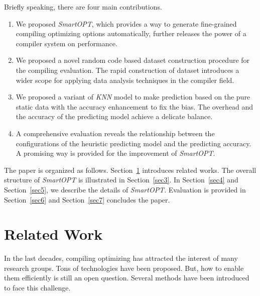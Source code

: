 \documentclass[bst/sn-mathphys]{sn-jnl}%
\theoremstyle{thmstyleone}%
\theoremstyle{thmstyletwo}%
\theoremstyle{thmstylethree}%
\begin{document}
Briefly speaking, there are four main contributions.

\begin{enumerate}[1.]
	\item We proposed \emph{SmartOPT}, which provides a way to generate 
	fine-grained compiling optimizing options automatically, further 
	releases the power of a compiler system on performance.

	\item We proposed a novel random code based dataset construction 
	procedure for the compiling evaluation. The rapid construction of 
	dataset introduces a wider scope for applying data analysis 
	techniques in the compiler field.

	\item We proposed a variant of \emph{KNN} model to make prediction
	based on the pure static data with the accuracy enhancement to fix the 
	bias. The overhead and the accuracy of the predicting model achieve a 
	delicate balance.

	\item A comprehensive evaluation reveals the relationship between the 
	configurations of the heuristic predicting model and the predicting 
	accuracy. A promising way is provided for the improvement of 
	\emph{SmartOPT}.
\end{enumerate}

The paper is organized as follows. Section~\ref{sec2} introduces related works.
The overall structure of \emph{SmartOPT} is illustrated in Section~\ref{sec3}. 
In Section~\ref{sec4} and Section~\ref{sec5}, we describe the details of 
\emph{SmartOPT}. Evaluation is provided in Section~\ref{sec6} and 
Section~\ref{sec7} concludes the paper.


\section{Related Work}\label{sec2}

In the last decades, compiling optimizing has attracted the interest of many 
research groups. Tons of technologies have been proposed. But, how to enable 
them efficiently is still an open question. Several methods have been 
introduced to face this challenge.
\end{document}

